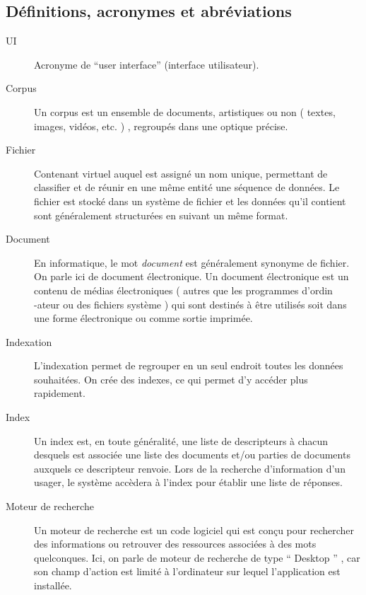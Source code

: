 \subsection{Définitions, acronymes et abréviations}

\begin{description}

\item[UI]
Acronyme de “user interface” (interface utilisateur).

\item[Corpus]
Un corpus est un ensemble de documents, artistiques ou non ( textes, images,
vidéos, etc. ) , regroupés dans une optique précise. 

\item[Fichier]
 Contenant virtuel auquel est assigné un nom unique, permettant de classifier et
de réunir en une même entité une séquence de données. Le fichier est stocké dans
un système de fichier et les données qu'il contient sont généralement
structurées en suivant un même format.

\item[Document]
En informatique, le mot \textit{document} est généralement synonyme de fichier.
On
parle ici de document électronique. Un document électronique est un contenu de
médias électroniques ( autres que les programmes d'ordin\\-ateur ou des fichiers
système ) qui sont destinés à être utilisés soit dans une forme électronique ou
comme sortie imprimée.

\item[Indexation]
L'indexation permet de regrouper en un seul endroit toutes les données
souhaitées. On crée des indexes, ce qui permet d'y accéder plus rapidement. 

\item[Index]
Un index est, en toute généralité, une liste de descripteurs à chacun desquels
est associée une liste des documents et/ou parties de documents auxquels ce
descripteur renvoie. Lors de la recherche d'information d'un usager, le système
accèdera à l'index pour établir une liste de réponses. 

\item[Moteur de recherche]
Un moteur de recherche est un code logiciel qui est conçu pour rechercher des
informations ou retrouver des ressources associées à des mots quelconques. Ici,
on parle de moteur de recherche de type “ Desktop ” , car son champ d'action est
limité à l'ordinateur sur lequel l'application est installée. 


\end{description}
